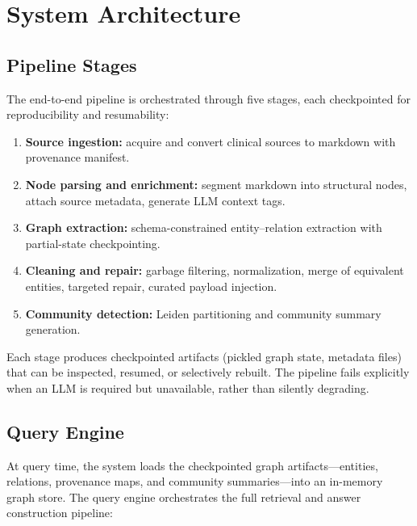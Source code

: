 \documentclass[12pt,a4paper]{article}
\begin{document}
\section{System Architecture}

\subsection{Pipeline Stages}

The end-to-end pipeline is orchestrated through five stages, each checkpointed for reproducibility and resumability:

\begin{enumerate}[nosep]
    \item \textbf{Source ingestion:} acquire and convert clinical sources to markdown with provenance manifest.
    \item \textbf{Node parsing and enrichment:} segment markdown into structural nodes, attach source metadata, generate LLM context tags.
    \item \textbf{Graph extraction:} schema-constrained entity--relation extraction with partial-state checkpointing.
    \item \textbf{Cleaning and repair:} garbage filtering, normalization, merge of equivalent entities, targeted repair, curated payload injection.
    \item \textbf{Community detection:} Leiden partitioning and community summary generation.
\end{enumerate}

Each stage produces checkpointed artifacts (pickled graph state, metadata files) that can be inspected, resumed, or selectively rebuilt. The pipeline fails explicitly when an LLM is required but unavailable, rather than silently degrading.

\subsection{Query Engine}

At query time, the system loads the checkpointed graph artifacts---entities, relations, provenance maps, and community summaries---into an in-memory graph store. The query engine orchestrates the full retrieval and answer construction pipeline:
\end{document}
